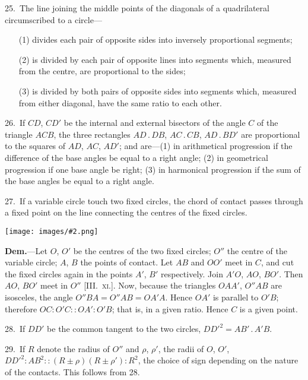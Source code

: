\documentclass[oneside]{book}
\newcommand\imgcent[2]{
\begin{center}
\texttt{[image: images/\#2.png]}
\end{center}
}
\begin{document}
\begin{footnotesize}
25.~The line joining the middle points of the diagonals of a
quadrilateral circumscribed to a circle---
\begin{changemargin}{0.3in}{0in}
\begin{enumerate}
   \item[(1)] divides each pair of opposite sides into inversely proportional segments;
   \item[(2)] is divided by each pair of opposite lines into segments which, measured from the centre, are proportional to the sides;
   \item[(3)] is divided by both pairs of opposite sides into segments which, measured from either diagonal, have the same ratio to each other.
\end{enumerate}
\end{changemargin}

26.~If $CD$, $CD'$ be the internal and external bisectors of the
angle $C$ of the triangle $ACB$, the three rectangles $AD\,.\, DB$,
$AC\,.\, CB$, $AD\,.\, BD'$ are proportional to the squares of $AD$, $AC$,
$AD'$; and are---(1) in arithmetical progression if the difference of
the base angles be equal to a right angle; (2) in geometrical
progression if one base angle be right; (3) in harmonical
progression if the sum of the base angles be equal to a right angle.

27.~If a variable circle touch two fixed circles, the chord of
contact passes through a fixed point on the line connecting the
centres of the fixed circles.

\imgcent{304}{f213}

\textbf{Dem.}---Let $O$, $O'$ be the centres of the two fixed circles; $O''$
the centre of the variable circle; $A$, $B$ the points of contact. Let
$AB$ and $OO'$ meet in $C$, and cut the fixed circles again in the
points $A'$, $B'$ respectively. Join $A'O$, $AO$, $BO'$. Then $AO$, $BO'$
meet in $O''$ [III\@.~\textsc{xi.}]. Now, because the triangles $OAA'$, $O''AB$
are isosceles, the angle $O''BA = O''AB = OA'A$. Hence $OA'$ is
parallel to $O'B$; therefore $OC : O'C :: OA' : O'B$; that is, in a
given ratio. Hence $C$ is a given point.

28.~If $DD'$ be the common tangent to the two circles, $DD'^{2}
= AB' \,.\, A'B$.

29.~If $R$ denote the radius of $O''$ and $\rho$, $\rho'$, the radii of $O$, $O'$,
$DD'^{2} : AB^{2} :: (R \pm \rho)(R \pm \rho') : R^{2}$, the choice of sign depending
on the nature of the contacts. This follows from 28.


\end{footnotesize}
\end{document}
